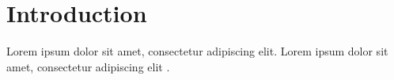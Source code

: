 
\section{Introduction}

\lettrine[nindent=0em,lines=3]{L} \noindent orem ipsum dolor sit amet, consectetur adipiscing elit.
\noindent \lipsum[2-7]
Lorem ipsum dolor sit amet, consectetur adipiscing elit \cite{ISOIEC9126}.
